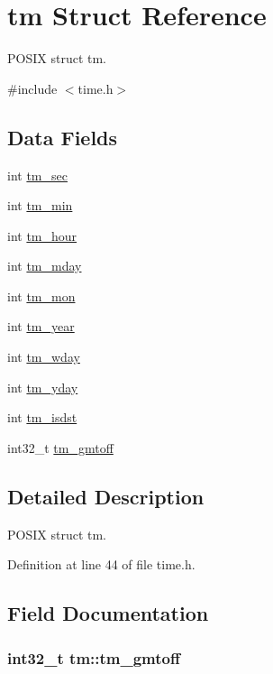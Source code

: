 \hypertarget{structtm}{\section{tm Struct Reference}
\label{structtm}
}


P\-O\-S\-I\-X struct tm.  




{\ttfamily \#include $<$time.\-h$>$}

\subsection*{Data Fields}
\begin{DoxyCompactItemize}
\item 
int \hyperlink{structtm_a4d098a9a5c03a00b2ee61e10851de81e}{tm\-\_\-sec}
\item 
int \hyperlink{structtm_af414eb7c86cc3099595211eee4d4211b}{tm\-\_\-min}
\item 
int \hyperlink{structtm_a3e7ca4e37f1abcaf56b8a916c38eb9fe}{tm\-\_\-hour}
\item 
int \hyperlink{structtm_ab8d8904bad43b0c8b96e61941c5b5310}{tm\-\_\-mday}
\item 
int \hyperlink{structtm_a112ac36fa2f593777138a417cf031e17}{tm\-\_\-mon}
\item 
int \hyperlink{structtm_a33adf78fd6476b2120ce3b9c4a852053}{tm\-\_\-year}
\item 
int \hyperlink{structtm_afe81a8c46f1c693c43f259b288859f4f}{tm\-\_\-wday}
\item 
int \hyperlink{structtm_a93a0ba77cc23796df84405dcbcc57eb1}{tm\-\_\-yday}
\item 
int \hyperlink{structtm_a5645ca0580c8ab2c24f6c2965d9c9f9c}{tm\-\_\-isdst}
\item 
int32\-\_\-t \hyperlink{structtm_a6b7d1fb16f21197ea027e364e2812c3d}{tm\-\_\-gmtoff}
\end{DoxyCompactItemize}


\subsection{Detailed Description}
P\-O\-S\-I\-X struct tm. 

Definition at line 44 of file time.\-h.



\subsection{Field Documentation}
\hypertarget{structtm_a6b7d1fb16f21197ea027e364e2812c3d}{
\subsubsection[{tm\-\_\-gmtoff}]{\setlength{\rightskip}{0pt plus 5cm}int32\-\_\-t tm\-::tm\-\_\-gmtoff}}\label{structtm_a6b7d1fb16f21197ea027e364e2812c3d}


